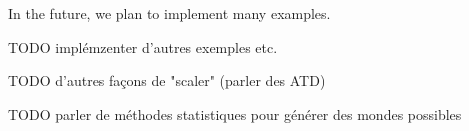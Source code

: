 In the future, we plan to implement many examples. 


TODO implémzenter d'autres exemples etc.


TODO d'autres façons de "scaler" (parler des ATD)

TODO parler de méthodes statistiques pour générer des mondes possibles